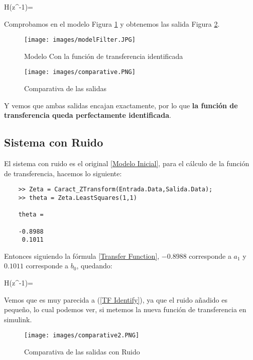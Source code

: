 \documentclass[a4paper, fontsize=11pt]{scrartcl} %
\numberwithin{equation}{section} %
\numberwithin{figure}{section} %
\numberwithin{table}{section} %
\newenvironment{myalign}{\par\nobreak\large\noindent\align}{\endalign} %
\begin{document}
	\begin{myalign}
			H(z^{-1})= 
			\label{TF Identify}
	\end{myalign}
	
	Comprobamos en el modelo Figura \ref{Modelo Filtro} y obtenemos las salida Figura \ref{Comparativa}. 
	
	\begin{figure}[h!]
		\centering
		\texttt{[image: images/modelFilter.JPG]}
		\caption{Modelo Con la función de transferencia identificada}
		\label{Modelo Filtro}
	\end{figure}
	\FloatBarrier
	
	\begin{figure}[h!]
		\centering
		\texttt{[image: images/comparative.PNG]}
		\caption{Comparativa de las salidas}
		\label{Comparativa}
	\end{figure}
	\FloatBarrier

	Y vemos que ambas salidas encajan exactamente, por lo que \textbf{la función de transferencia queda perfectamente identificada}.
	
	\subsection{Sistema con Ruido}
	
	El sistema con ruido es el original \ref{Modelo Inicial}, para el cálculo de la función de transferencia, hacemos lo siguiente:
	
	\begin{lstlisting}
	>> Zeta = Caract_ZTransform(Entrada.Data,Salida.Data);
	>> theta = Zeta.LeastSquares(1,1)
	
	theta =
	
	-0.8988
	 0.1011
	\end{lstlisting}
	
	Entonces siguiendo la fórmula \ref{Transfer Function}, $-0.8988$ corresponde a $a_1$ y $0.1011$ corresponde a $b_0$, quedando:
	
	\begin{myalign}
		H(z^{-1})= 
		\label{TF Noise}
	\end{myalign}
	
	Vemos que es muy parecida a (\ref{TF Identify}), ya que el ruido añadido es pequeño, lo cual podemos ver, si metemos la nueva función de transferencia en simulink.
	
	\begin{figure}[h!]
		\centering
		\texttt{[image: images/comparative2.PNG]}
		\caption{Comparativa de las salidas con Ruido}
		\label{Comparativa2}
	\end{figure}
	\FloatBarrier
	
\end{document}
